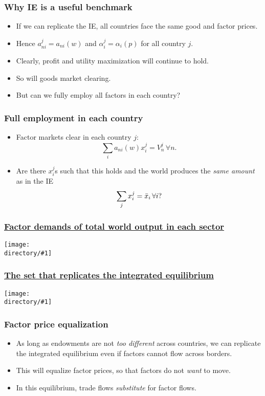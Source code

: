 \documentclass[compress,mathserif,aspectratio=169]{beamer}
\newcounter{ora}
\newcommand{\directory}{figures}
\newcommand{\widefigure}[2]{\begin{frame}\frametitle{\hyperlink{#1back}{#2}}\hypertarget{#1}{{\begin{center}\texttt{[image: \\directory/\#1]}\end{center}}}\end{frame}}
\newcommand{\longfigure}[2]{\begin{frame}\frametitle{\hyperlink{#1back}{#2}}\hypertarget{#1}{{\begin{center}\texttt{[image: \\directory/\#1]}\end{center}}}\end{frame}}
\begin{document}
\begin{frame}\frametitle{Why IE is a useful benchmark}\hypertarget{Why IE is a useful benchmark}{}
\begin{itemize}
\item If we can replicate the IE, all countries face the same good and factor prices.

\item Hence $a_{ni}^j=a_{ni}(w)$ and $\alpha_i^j = \alpha_i(p)$ for all country $j$.

\item Clearly, profit and utility maximization will continue to hold.

\item So will goods market clearing.

\item But can we fully employ all factors in each country?


\end{itemize}
\end{frame}



\begin{frame}\frametitle{Full employment in each country}\hypertarget{Full employment in each country}{}
\begin{itemize}
\item Factor markets clear in each country $j$:
\[
\sum_i a_{ni}(w)x_i^j = V_n^j\,\forall n.
\]

\item Are there $x_i^j$s such that this holds and the world produces the \emph{same amount} as in the IE
\[
\sum_j x_i^j = \Bar x_i\,\forall i?
\]






\end{itemize}
\end{frame}




\longfigure{HK1-1}{Factor demands of total world output in each sector}
\widefigure{HK1-2}{The set that replicates the integrated equilibrium}


\begin{frame}\frametitle{Factor price equalization}\hypertarget{Factor price equalization}{}
\begin{itemize}
\item As long as endowments are not \emph{too different} across countries, we can replicate the integrated equilibrium even if factors cannot flow across borders.

\item This will equalize factor prices, so that factors do not \emph{want} to move.

\item In this equilibrium, trade flows \emph{substitute} for factor flows.




\end{itemize}
\end{frame}
\end{document}
